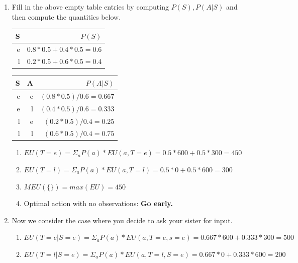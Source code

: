 \documentclass[12pt]{article}
\begin{document}
\begin{enumerate}

\item Fill in the above empty table entries by computing $P(S), P(A|S)$ and then compute the quantities below. 

\begin{tabular}{|r|r|} \hline
S  & $P(S)$ \\ \hline
e &   $0.8 * 0.5 + 0.4 * 0.5 = 0.6$    \\ \hline
l &   $0.2 * 0.5 + 0.6 * 0.5 = 0.4$   \\ \hline
\end{tabular}

\begin{tabular}{|r|r|r|} \hline
S & A & $P(A|S)$ \\ \hline
e & e & $(0.8 * 0.5) / 0.6 = 0.667$ \\ \hline
e & l & $(0.4 * 0.5) / 0.6 = 0.333$ \\ \hline
l & e & $(0.2 * 0.5) / 0.4 = 0.25$ \\ \hline
l & l & $(0.6 * 0.5) / 0.4 = 0.75$ \\ \hline
\end{tabular}

\begin{enumerate}

\item $EU(T=e) = \Sigma_a P(a) * EU(a, T = e) = 0.5 * 600 + 0.5 * 300 = 450$

\item $EU(T=l) = \Sigma_a P(a) * EU(a, T = l) = 0.5 * 0 + 0.5 * 600 = 300$

\item $MEU( \{ \} ) = max(EU) = 450$

\item Optimal action with no observations: \textbf{Go early.}

\end{enumerate}

\item Now we consider the case where you decide to ask your sister for input.

\begin{enumerate}

\item $EU(T=e | S = e) = \Sigma_a P(a) * EU(a, T = e, s = e) = 0.667 * 600 + 0.333 * 300 = 500$

\item $EU(T=l | S = e) = \Sigma_a P(a) * EU(a, T = l, S = e) = 0.667 * 0 + 0.333 * 600 = 200$


\end{enumerate}
\end{enumerate}
\end{document}
